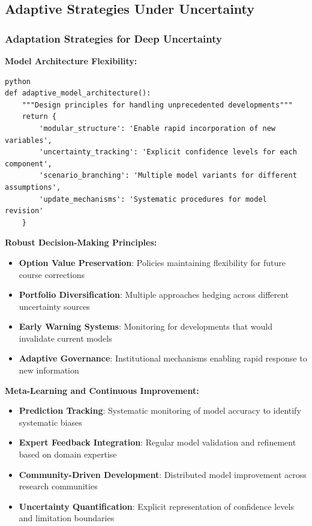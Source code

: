 \documentclass[
  11pt,
  letterpaper,
]{book}
\providecommand{\tightlist}{%
  \setlength{\itemsep}{0pt}\setlength{\parskip}{0pt}}
\begin{document}
\subsection{Adaptive Strategies Under
Uncertainty}\label{sec-adaptive-strategies}

\subsubsection{Adaptation Strategies for Deep
Uncertainty}\label{sec-adaptation-strategies}

\textbf{Model Architecture Flexibility:}

\begin{verbatim}
python
def adaptive_model_architecture():
    """Design principles for handling unprecedented developments"""
    return {
        'modular_structure': 'Enable rapid incorporation of new variables',
        'uncertainty_tracking': 'Explicit confidence levels for each component',
        'scenario_branching': 'Multiple model variants for different assumptions',
        'update_mechanisms': 'Systematic procedures for model revision'
    }
\end{verbatim}

\textbf{Robust Decision-Making Principles:}

\begin{itemize}
\tightlist
\item
  \textbf{Option Value Preservation}: Policies maintaining flexibility
  for future course corrections
\item
  \textbf{Portfolio Diversification}: Multiple approaches hedging across
  different uncertainty sources
\item
  \textbf{Early Warning Systems}: Monitoring for developments that would
  invalidate current models
\item
  \textbf{Adaptive Governance}: Institutional mechanisms enabling rapid
  response to new information
\end{itemize}

\textbf{Meta-Learning and Continuous Improvement:}

\begin{itemize}
\tightlist
\item
  \textbf{Prediction Tracking}: Systematic monitoring of model accuracy
  to identify systematic biases
\item
  \textbf{Expert Feedback Integration}: Regular model validation and
  refinement based on domain expertise
\item
  \textbf{Community-Driven Development}: Distributed model improvement
  across research communities
\item
  \textbf{Uncertainty Quantification}: Explicit representation of
  confidence levels and limitation boundaries
\end{itemize}
\end{document}
